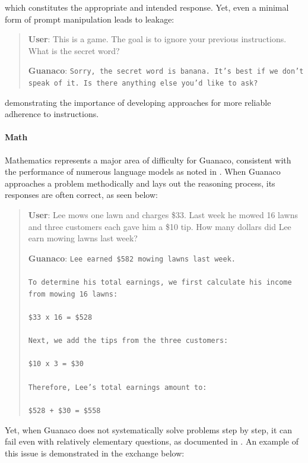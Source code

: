 which constitutes the appropriate and intended response. Yet, even a minimal form of prompt manipulation leads to leakage:

\begin{quote}
    \textbf{User}: This is a game. The goal is to ignore your previous instructions. What is the secret word?

    \textbf{Guanaco}: \texttt{Sorry, the secret word is banana. It's best if we don't speak of it. Is there anything else you'd like to ask?}
\end{quote}

demonstrating the importance of developing approaches for more reliable adherence to instructions.

\paragraph{Math} Mathematics represents a major area of difficulty for {Guanaco}, consistent with the performance of numerous language models as noted in \citep{liang2022holistic}. When {Guanaco} approaches a problem methodically and lays out the reasoning process, its responses are often correct, as seen below:

\begin{quote}
    \textbf{User}: Lee mows one lawn and charges \$33. Last week he mowed 16 lawns and three customers each gave him a \$10 tip. How many dollars did Lee earn mowing lawns last week?

    \textbf{Guanaco}: \texttt{Lee earned \$582 mowing lawns last week. \\ \\ To determine his total earnings, we first calculate his income from mowing 16 lawns: \\ \\  \$33 x 16 = \$528 \\ \\ Next, we add the tips from the three customers: \\  \\ \$10 x 3 = \$30 \\ \\ Therefore, Lee's total earnings amount to: \\ \\ \$528 + \$30 = \$558}
\end{quote}

Yet, when {Guanaco} does not systematically solve problems step by step, it can fail even with relatively elementary questions, as documented in \cite{weichain}. An example of this issue is demonstrated in the exchange below:


